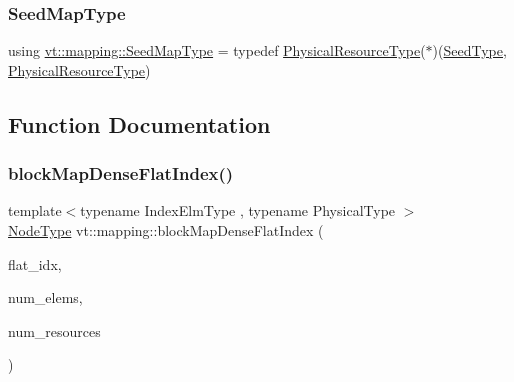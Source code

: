 \subsubsection{\texorpdfstring{Seed\+Map\+Type}{SeedMapType}}
{\footnotesize\ttfamily using \hyperlink{namespacevt_1_1mapping_a1c1409d9af8d1ac402af022a65be4a4d}{vt\+::mapping\+::\+Seed\+Map\+Type} = typedef \hyperlink{namespacevt_a2dc36fcada816dc6d11774d650328ee9}{Physical\+Resource\+Type}($\ast$)(\hyperlink{namespacevt_ae2e13198bdef4d5b8e603d6c1c7f0969}{Seed\+Type}, \hyperlink{namespacevt_a2dc36fcada816dc6d11774d650328ee9}{Physical\+Resource\+Type})}



\subsection{Function Documentation}
\mbox{\label{namespacevt_1_1mapping_abaff3ea69ef07a3762befc3628b8b577}} 
\subsubsection{\texorpdfstring{block\+Map\+Dense\+Flat\+Index()}{blockMapDenseFlatIndex()}}
{\footnotesize\ttfamily template$<$typename Index\+Elm\+Type , typename Physical\+Type $>$ \\
\hyperlink{namespacevt_a866da9d0efc19c0a1ce79e9e492f47e2}{Node\+Type} vt\+::mapping\+::block\+Map\+Dense\+Flat\+Index (\begin{DoxyParamCaption}\item[{Index\+Elm\+Type $\ast$}]{flat\+\_\+idx,  }\item[{Index\+Elm\+Type $\ast$}]{num\+\_\+elems,  }\item[{Physical\+Type}]{num\+\_\+resources }\end{DoxyParamCaption})\hspace{0.3cm}{\ttfamily [inline]}}

\mbox{\label{namespacevt_1_1mapping_ae055a42b89a59fd6d0cc6d40f9abf3b5}} 
